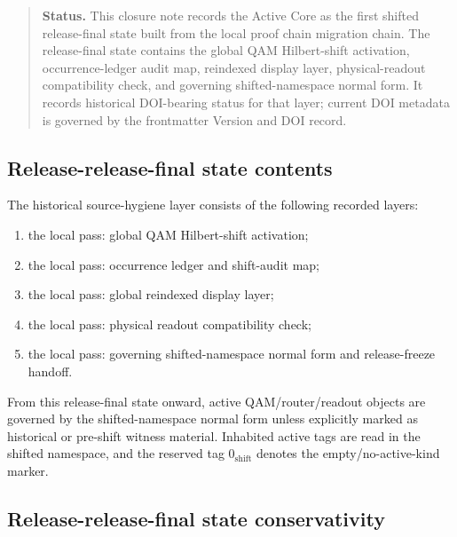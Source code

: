 \begin{quote}\small
\noindent\textbf{Status.}
This closure note records the  Active Core as the first shifted
release-final state built from the local proof chain migration chain. The release-final state
contains the global QAM Hilbert-shift activation, occurrence-ledger audit map,
reindexed display layer, physical-readout compatibility check, and governing
shifted-namespace normal form. It records historical DOI-bearing status for that layer; current  DOI metadata is governed by the frontmatter Version and DOI record.
\end{quote}

\subsection{Release-release-final state contents}
\label{subsec:v400-release-final-contents}

\begin{definition}
\label{def:v400-release-final-content}
The  historical source-hygiene layer consists of the following recorded layers:
\begin{enumerate}[leftmargin=*]
 \item the local pass: global QAM Hilbert-shift activation;
 \item the local pass: occurrence ledger and shift-audit map;
 \item the local pass: global reindexed display layer;
 \item the local pass: physical readout compatibility check;
 \item the local pass: governing shifted-namespace normal form and release-freeze handoff.
\end{enumerate}
\end{definition}

\begin{definition}
\label{def:v400-release-final-governing-rule}
From this release-final state onward, active QAM/router/readout objects are governed by
the shifted-namespace normal form unless explicitly marked as historical or pre-shift witness
material. Inhabited active tags are read in the shifted namespace, and the
reserved tag $0_{\mathrm{shift}}$ denotes the empty/no-active-kind marker.
\end{definition}

\subsection{Release-release-final state conservativity}
\label{subsec:v400-release-final-conservativity}

